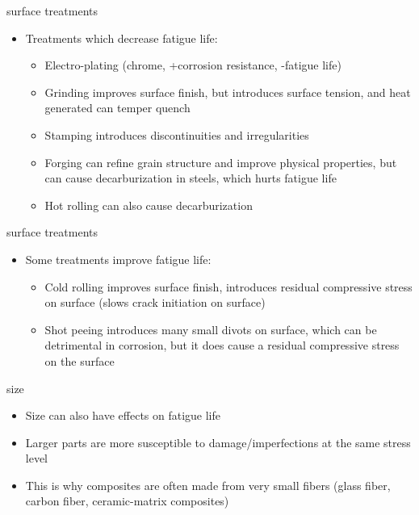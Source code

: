 \documentclass[
  letterpaper,
  ignorenonframetext,
  aspectratio=43,
  handout,
  12pt]{beamer}
\providecommand{\tightlist}{%
  \setlength{\itemsep}{0pt}\setlength{\parskip}{0pt}}
\providecommand{\tightlist}{%
\setlength{\itemsep}{0pt}\setlength{\parskip}{0pt}}
\begin{document}
\begin{frame}{surface treatments}
\protect\hypertarget{surface-treatments}{}
\begin{itemize}
\tightlist
\item
  Treatments which decrease fatigue life:

  \begin{itemize}
  \tightlist
  \item
    Electro-plating (chrome, +corrosion resistance, -fatigue life)
  \item
    Grinding improves surface finish, but introduces surface tension,
    and heat generated can temper quench
  \item
    Stamping introduces discontinuities and irregularities
  \item
    Forging can refine grain structure and improve physical properties,
    but can cause decarburization in steels, which hurts fatigue life
  \item
    Hot rolling can also cause decarburization
  \end{itemize}
\end{itemize}
\end{frame}

\begin{frame}{surface treatments}
\protect\hypertarget{surface-treatments-1}{}
\begin{itemize}
\tightlist
\item
  Some treatments improve fatigue life:

  \begin{itemize}
  \tightlist
  \item
    Cold rolling improves surface finish, introduces residual
    compressive stress on surface (slows crack initiation on surface)
  \item
    Shot peeing introduces many small divots on surface, which can be
    detrimental in corrosion, but it does cause a residual compressive
    stress on the surface
  \end{itemize}
\end{itemize}
\end{frame}

\begin{frame}{size}
\protect\hypertarget{size}{}
\begin{itemize}
\tightlist
\item
  Size can also have effects on fatigue life
\item
  Larger parts are more susceptible to damage/imperfections at the same
  stress level
\item
  This is why composites are often made from very small fibers (glass
  fiber, carbon fiber, ceramic-matrix composites)
\end{itemize}
\end{frame}
\end{document}
